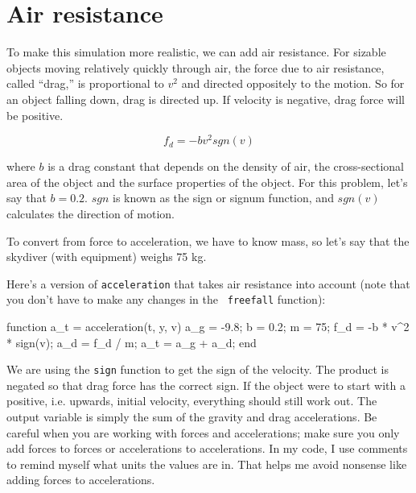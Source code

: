 \documentclass[
]{book}
\numberwithin{Answer}{chapter}
\numberwithin{Exercise}{chapter}
\begin{document}
\section{Air resistance}
\label{sect:air_resistance}

To make this simulation more realistic, we can add air resistance.
For sizable objects moving relatively quickly through air, the force due to air
resistance, called ``drag,'' is proportional to $v^2$ and directed
oppositely to the motion.  So for an object falling down, drag is
directed up.  If velocity is negative, drag force will be positive.

\begin{equation}\label{eq:simpledrag}
    f_{d} = - b v^2 sgn(v)
\end{equation}

where $b$ is a drag constant that depends on the density of
air, the cross-sectional area of the object and the surface properties
of the object.  For this problem, let's say that $b = 0.2$.  $sgn$ is
known as the sign or signum function, and $sgn(v)$ calculates the
direction of motion.

To convert from force to acceleration, we have to know mass, so let's
say that the skydiver (with equipment) weighs 75 kg.

Here's a version of {\tt acceleration} that takes air resistance into
account (note that you don't have to make any changes in the {\tt
freefall} function):

\begin{code}
function a_t = acceleration(t, y, v)
    a_g = -9.8;               %
    b = 0.2;                  %
    m = 75;                   %
    f_d = -b * v^2 * sign(v); %
    a_d = f_d / m;            %
    a_t = a_g + a_d;          %
end
\end{code}

We are using the {\tt sign} function to get the sign of the velocity.  The 
product is negated so that drag force has the correct sign.  If the object
were to start with a positive, i.e. upwards, initial velocity, everything 
should still work out.   
The output variable is simply the sum of the gravity and drag accelerations.
Be careful when you are working with forces and accelerations; make sure
you only add forces to forces or accelerations to accelerations.  In my
code, I use comments to remind myself what units the values are in.
That helps me avoid nonsense like adding forces to accelerations.
\end{document}
